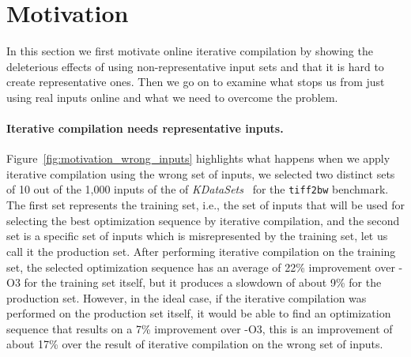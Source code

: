 \section{Motivation \label{sec:motivation}}


    In this section we first motivate online iterative compilation by showing the deleterious effects of using non-representative input
    sets and that it is hard to create representative ones. Then we go on to examine what stops us from just using real inputs online and
    what we need to overcome the problem.

    \paragraph{Iterative compilation needs representative inputs.} 
    Figure~\ref{fig:motivation_wrong_inputs} highlights what happens when we apply iterative compilation using the wrong set of inputs, we selected two distinct sets of
    10 out of the 1,000 inputs of the of \textit{KDataSets}~\cite{chen10,chen12a} for the \texttt{tiff2bw} benchmark.
    The first set represents the training set, i.e., the set of inputs that will be used for selecting the best optimization sequence by
    iterative compilation, and the second set is a specific set of inputs which is misrepresented by the training set, let us call it the production set.
    After performing iterative compilation on the training set, the selected optimization sequence has an average of 22\% improvement over -O3 for
    the training set itself, but it produces a slowdown of about 9\% for the production set.
    However, in the ideal case, if the iterative compilation was performed on the production set itself, it would be able to find an optimization sequence that
    results on a 7\% improvement over -O3, this is an improvement of about 17\% over
    the result of iterative compilation on the wrong set of inputs.

